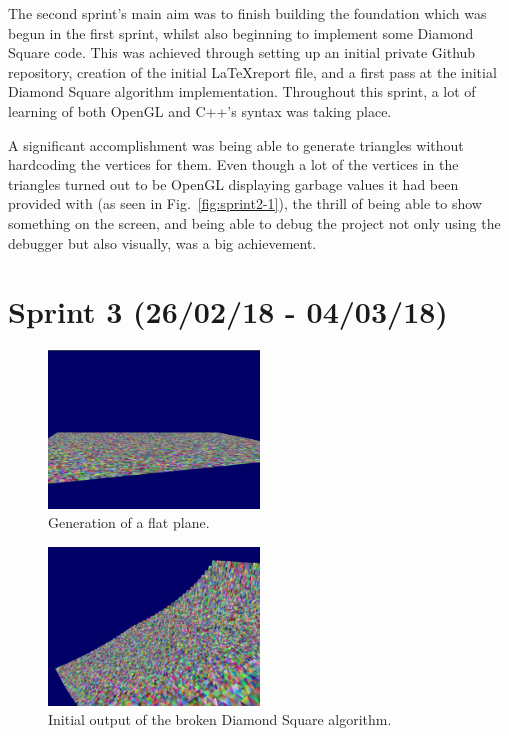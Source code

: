 \documentclass[a4paper,10pt]{report}
\begin{document}
The second sprint's main aim was to finish building the foundation which was begun in the first sprint, whilst also beginning to implement some Diamond Square code. This was achieved through setting up an initial private Github repository, creation of the initial \LaTeX  report file, and a first pass at the initial Diamond Square algorithm implementation. Throughout this sprint, a lot of learning of both OpenGL and C++'s syntax was taking place.  \medskip

A significant accomplishment was being able to generate triangles without hardcoding the vertices for them. Even though a lot of the vertices in the triangles turned out to be OpenGL displaying garbage values it had been provided with (as seen in Fig.~\ref{fig:sprint2-1}), the thrill of being able to show something on the screen, and being able to debug the project not only using the debugger but also visually, was a big achievement. 

\clearpage

\section{Sprint 3 (26/02/18 - 04/03/18)}


\begin{figure}[h!]
    \centering
  \includegraphics[width=0.5\textwidth]{Images/Sprint-Images/Sprint3-2.png}
 \caption{Generation of a flat plane.}
  \label{fig:sprint3-2}
\end{figure}

\begin{figure}[h!]
    \centering
  \includegraphics[width=0.5\textwidth]{Images/Sprint-Images/Sprint3-3.png}
 \caption{Initial output of the broken Diamond Square algorithm.}
  \label{fig:sprint3-3}
\end{figure}
\end{document}
